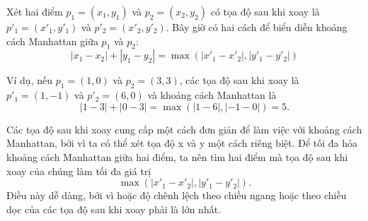 Xét hai điểm $p_1=(x_1,y_1)$ và $p_2=(x_2,y_2)$ có tọa độ sau khi xoay
là $p'_1=(x'_1,y'_1)$ và $p'_2=(x'_2,y'_2)$.
Bây giờ có hai cách để biểu diễn khoảng cách Manhattan
giữa $p_1$ và $p_2$:
\[|x_1-x_2|+|y_1-y_2| = \max(|x'_1-x'_2|,|y'_1-y'_2|)\]

Ví dụ, nếu $p_1=(1,0)$ và $p_2=(3,3)$,
các tọa độ sau khi xoay là $p'_1=(1,-1)$ và $p'_2=(6,0)$
và khoảng cách Manhattan là
\[|1-3|+|0-3| = \max(|1-6|,|-1-0|) = 5.\]

Các tọa độ sau khi xoay cung cấp một cách đơn giản
để làm việc với khoảng cách Manhattan, bởi vì ta có thể
xét tọa độ x và y một cách riêng biệt.
Để tối đa hóa khoảng cách Manhattan giữa hai điểm,
ta nên tìm hai điểm mà
tọa độ sau khi xoay của chúng làm tối đa giá trị
\[\max(|x'_1-x'_2|,|y'_1-y'_2|).\]
Điều này dễ dàng, bởi vì hoặc độ chênh lệch theo chiều ngang hoặc theo chiều dọc
của các tọa độ sau khi xoay phải là lớn nhất.
